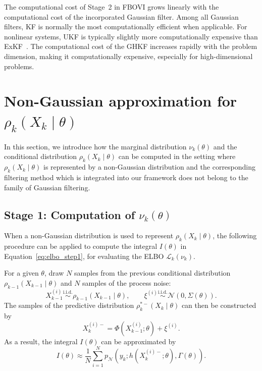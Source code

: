 \documentclass[preprint,3p,times]{elsarticle}
\newcommand{\pdense}{p}
\begin{document}
The computational cost of Stage~2 in FBOVI grows linearly with the computational cost of the incorporated Gaussian filter. Among all Gaussian filters, KF is normally the most computationally efficient when applicable. For nonlinear systems, UKF is typically slightly more computationally expensive than ExKF~\cite{bayesian_filter}. The computational cost of the GHKF increases rapidly with the problem dimension, making it computationally expensive, especially for high-dimensional problems.


\section{Non-Gaussian approximation for $\rho_k(X_k \mid \theta)$}
\label{app:non_Gaussian}
In this section, we introduce how the marginal distribution $\nu_k(\theta)$ and the conditional distribution $\rho_k(X_k \mid \theta)$ can be computed in the setting where $\rho_k(X_k \mid \theta)$ is represented by a non-Gaussian distribution and the corresponding filtering method which is integrated into our framework does not belong to the family of Gaussian filtering.

\subsection{Stage 1: Computation of $\nu_k(\theta)$}
\label{sec:step1_eg1}
When a non-Gaussian distribution is used to represent $\rho_k(X_k \mid \theta)$, the following procedure can be applied to compute the integral $I(\theta)$ in Equation~\eqref{eq:elbo_step1}, for evaluating the ELBO $\mathcal{L}_k(\nu_k)$.  

For a given $\theta$, draw $N$ samples from the previous conditional distribution $\rho_{k-1}(X_{k-1} \mid \theta)$ and $N$ samples of the process noise:
\begin{equation*}
X_{k-1}^{(i)} \overset{\mathrm{i.i.d.}}{\sim} \rho_{k-1}(X_{k-1} \mid \theta), \qquad 
\xi^{(i)} \overset{\mathrm{i.i.d.}}{\sim} \mathcal{N}(0,\Sigma(\theta)). 
\end{equation*}
The samples of the predictive distribution $\rho_k^{*-}(X_k \mid \theta)$ can then be constructed by
\begin{equation*}
X_k^{(i)-} = \Phi(X_{k-1}^{(i)};\theta) + \xi^{(i)}.
\end{equation*}
As a result, the integral 
\(I(\theta)\) can be approximated by
\begin{equation}
I(\theta)
\approx \frac{1}{N}\sum_{i=1}^N \pdense_{\mathcal{N}}(y_k;h(X_k^{(i)-};\theta), \Gamma(\theta)).
\label{eq:elbo_eg1}
\end{equation}
\end{document}
